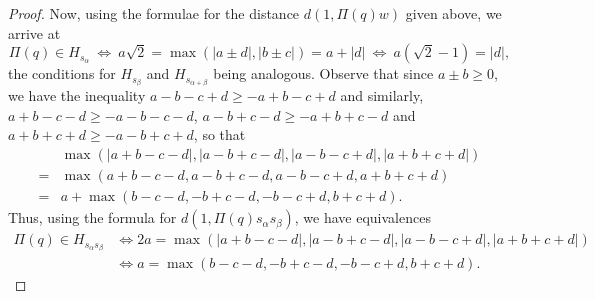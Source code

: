 \documentclass[10pt,a4paper]{amsart}
\begin{document}
\begin{proof}
Now, using the formulae for the distance $d(1,\Pi(q)w)$ given above, we arrive at
\[\Pi(q)\in H_{s_\alpha}~\Longleftrightarrow~a\sqrt{2}=\max(|a\pm d|,|b\pm c|)=a+|d|~\Longleftrightarrow~a(\sqrt{2}-1)=|d|,\]
the conditions for $H_{s_\beta}$ and $H_{s_{\alpha+\beta}}$ being analogous. 
Observe that since $a\pm b\ge0$, we have the inequality $a-b-c+d\ge -a+b-c+d$ and similarly, $a+b-c-d\ge -a-b-c-d$, $a-b+c-d\ge -a+b+c-d$ and $a+b+c+d\ge -a-b+c+d$, so that
\begin{align*}
&\max(|a+b-c-d|,|a-b+c-d|,|a-b-c+d|,|a+b+c+d|) \\
=&\max(a+b-c-d,a-b+c-d,a-b-c+d,a+b+c+d) \\
=&a+\max(b-c-d,-b+c-d,-b-c+d,b+c+d).
\end{align*}
Thus, using the formula for $d(1,\Pi(q)s_\alpha s_\beta)$, we have equivalences
\begin{align*}
\Pi(q)\in H_{s_\alpha s_\beta}&\Longleftrightarrow 2a=\max(|a+b-c-d|,|a-b+c-d|,|a-b-c+d|,|a+b+c+d|) \\ 
&\Longleftrightarrow a=\max(b-c-d,-b+c-d,-b-c+d,b+c+d).
\end{align*}
\end{proof}
\end{document}

